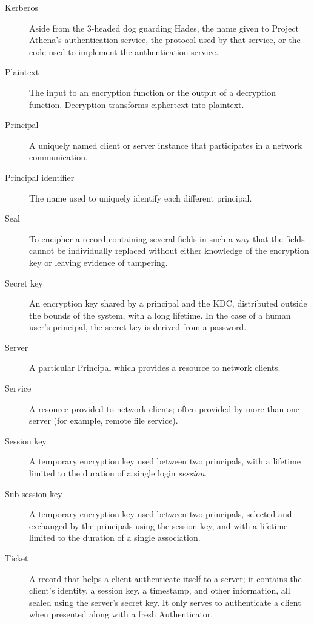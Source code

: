 \begin{description}
\item [Kerberos]
Aside from the 3-headed dog guarding Hades, the name given
to Project Athena's authentication service, the protocol used by that
service, or the code used to implement the authentication service.

\item [Plaintext]
The input to an encryption function or the output of a decryption
function.  Decryption transforms ciphertext into plaintext.

\item [Principal]
A uniquely named client or server instance that participates in
a network communication.

\item [Principal identifier]
The name used to uniquely identify each different
principal.

\item [Seal]
To encipher a record containing several fields in such a way
that the fields cannot be individually replaced without either
knowledge of the encryption key or leaving evidence of tampering.

\item [Secret key]
An encryption key shared by a principal and the KDC,
distributed outside the bounds of the system, with a long lifetime.
In the case of a human user's principal, the secret key is derived from a
password.

\item [Server]
A particular Principal which provides a resource to network clients.

\item [Service]
A resource provided to network clients; often provided by more than one
server (for example, remote file service).

\item [Session key]
A temporary encryption key used between two principals,
with a lifetime limited to the duration of a single login
{\em session}.

\item [Sub-session key] 
A temporary encryption key used between two
principals, selected and exchanged by the principals using the session
key, and with a lifetime limited to the duration of a single
association.

\item [Ticket]
A record that helps a client authenticate itself to a server; it contains
the client's identity, a session key, a timestamp, and other
information, all sealed using the server's secret key.  It only serves to
authenticate a client when presented along with a fresh Authenticator.

\end{description}
